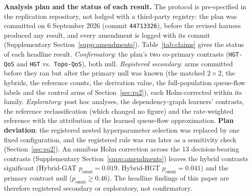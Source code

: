 \noindent\textbf{Analysis plan and the status of each result.} The protocol is pre-specified in the replication repository, not lodged with a third-party registry: the plan was committed on 6 September 2026 (commit \texttt{44713326}), before the revised harness produced any result, and every amendment is logged with its commit (Supplementary Section~\ref{supp:amendments}). Table~\ref{tab:claims} gives the status of each headline result. \emph{Confirmatory}: the plan's two co-primary contrasts (\texttt{HGT-QoS} and \texttt{HGT} vs.\ \texttt{Topo-QoS}), both null. \emph{Registered secondary}: arms committed before they ran but after the primary null was known (the matched $2\times2$, the hybrids, the reference counts, the derivation value, the full-population queue-flow labels and the control arms of Section~\ref{sec:rq2}), each Holm-corrected within its family. \emph{Exploratory}: post hoc analyses, the dependency-graph learners' contrasts, the reference reclassification (which changed no figure) and the rate-weighted reference with the attribution of the learned queue-flow approximation. \textbf{Plan deviation}: the registered nested hyperparameter selection was replaced by one fixed configuration, and the registered rule was run later as a sensitivity check (Section~\ref{sec:rq2}). An omnibus Holm correction across the 13 decision-bearing contrasts (Supplementary Section~\ref{supp:amendments}) leaves the hybrid contrasts significant (Hybrid-GAT $p_{\text{omni}} = 0.019$, Hybrid-HGT $p_{\text{omni}} = 0.041$) and the primary contrast null ($p_{\text{omni}} \ge 0.46$). The headline findings of this paper are therefore registered secondary or exploratory, not confirmatory.

